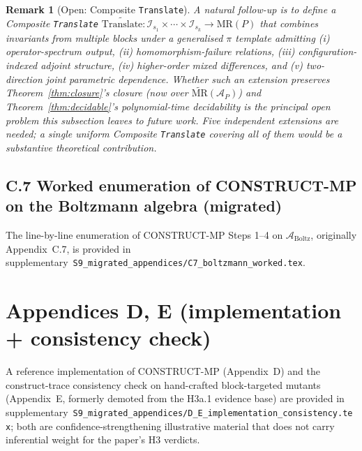 \documentclass[acmsmall, screen]{acmart}
\newtheorem{remark}{Remark}
\begin{document}
\begin{remark}[Open: Composite \texttt{Translate}]
\label{rem:composite-translate}
A natural follow-up is to define a \emph{Composite \texttt{Translate}} $\widetilde{\mathrm{Translate}}: \mathcal{I}_{s_{1}} \times \cdots \times \mathcal{I}_{s_{k}} \to \mathrm{MR}(P)$ that combines invariants from multiple blocks under a generalised $\pi$ template admitting (i) operator-spectrum output, (ii) homomorphism-failure relations, (iii) configuration-indexed adjoint structure, (iv) higher-order mixed differences, and (v) two-direction joint parametric dependence. Whether such an extension preserves Theorem~\ref{thm:closure}'s closure (now over $\widetilde{\mathrm{MR}}(\mathcal{A}_{P})$) and Theorem~\ref{thm:decidable}'s polynomial-time decidability is the principal open problem this subsection leaves to future work. Five independent extensions are needed; a single uniform Composite \texttt{Translate} covering all of them would be a substantive theoretical contribution.
\end{remark}

\subsection*{C.7 Worked enumeration of CONSTRUCT-MP on the Boltzmann algebra (migrated)}
\label{app:moved-C7}
The line-by-line enumeration of CONSTRUCT-MP Steps 1--4 on $\mathcal{A}_{\mathrm{Boltz}}$, originally Appendix~C.7, is provided in supplementary~\texttt{S9\_migrated\_appendices/C7\_boltzmann\_worked.tex}.

\section*{Appendices D, E (implementation + consistency check)}
\label{app:moved-D-E}
A reference implementation of CONSTRUCT-MP (Appendix~D) and the construct-trace consistency check on hand-crafted block-targeted mutants (Appendix~E, formerly demoted from the H3a.1 evidence base) are provided in supplementary~\texttt{S9\_migrated\_appendices/D\_E\_implementation\_consistency.tex}; both are confidence-strengthening illustrative material that does not carry inferential weight for the paper's H3 verdicts.
\end{document}

